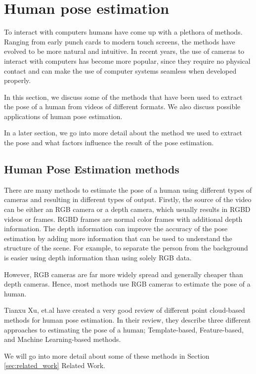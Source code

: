 \section{Human pose estimation}

To interact with computers humans have come up with a plethora of methods. Ranging from early punch cards to modern touch screens, the methods have evolved to be more natural and intuitive. In recent years, the use of cameras to interact with computers has become more popular, since they require no physical contact and can make the use of computer systems seamless when developed properly.

In this section, we discuss some of the methods that have been used to extract the pose of a human from videos of different formats. We also discuss possible applications of human pose estimation.

In a later section, we go into more detail about the method we used to extract the pose and what factors influence the result of the pose estimation. 

\subsection{Human Pose Estimation methods}

There are many methods to estimate the pose of a human using different types of cameras and resulting in different types of output. Firstly, the source of the video can be either an RGB camera or a depth camera, which usually results in RGBD videos or frames. RGBD frames are normal color frames with additional depth information. The depth information can improve the accuracy of the pose estimation by adding more information that can be used to understand the structure of the scene. For example, to separate the person from the background is easier using depth information than using solely RGB data.

However, RGB cameras are far more widely spread and generally cheaper than depth cameras. Hence, most methods use RGB cameras to estimate the pose of a human.

Tianxu Xu, et.al have created a very good review of different point cloud-based methods for human pose estimation\cite{ReviewPointcloudHPE}. In their review, they describe three different approaches to estimating the pose of a human; Template-based, Feature-based, and Machine Learning-based methods.

We will go into more detail about some of these methods in Section \ref{sec:related_work} Related Work.

